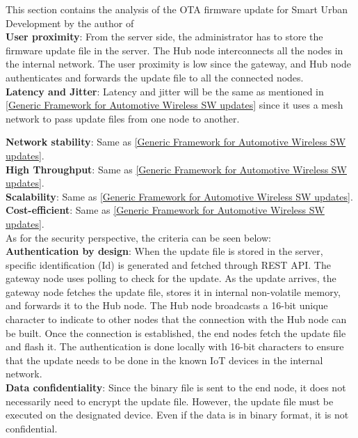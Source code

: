 \documentclass[12pt,a4paper]{article}
\begin{document}
{This section contains the analysis of the OTA firmware update for Smart Urban Development by the author of \cite{r30} \\

\textbf{User proximity}: From the server side, the administrator has to store the firmware update file in the server. The Hub node interconnects all the nodes in the internal network. The user proximity is low since the gateway, and Hub node authenticates and forwards the update file to all the connected nodes. \\

\textbf{Latency and Jitter}: Latency and jitter will be the same as mentioned in \ref{Generic Framework for Automotive Wireless SW updates} since it uses a mesh network to pass update files from one node to another.

\textbf{Network stability}: Same as \ref{Generic Framework for Automotive Wireless SW updates}. \\

\textbf{High Throughput}: Same as \ref{Generic Framework for Automotive Wireless SW updates}. \\

\textbf{Scalability}: Same as \ref{Generic Framework for Automotive Wireless SW updates}. \\

\textbf{Cost-efficient}: Same as \ref{Generic Framework for Automotive Wireless SW updates}. \\

As for the security perspective, the criteria can be seen below: \\

\textbf{Authentication by design}: When the update file is stored in the server, specific identification (Id) is generated and fetched through REST API. The gateway node uses polling to check for the update. As the update arrives, the gateway node fetches the update file, stores it in internal non-volatile memory, and forwards it to the Hub node. The Hub node broadcasts a 16-bit unique character to indicate to other nodes that the connection with the Hub node can be built. Once the connection is established, the end nodes fetch the update file and flash it. The authentication is done locally with 16-bit characters to ensure that the update needs to be done in the known IoT devices in the internal network. \\

\textbf{Data confidentiality}: Since the binary file is sent to the end node, it does not necessarily need to encrypt the update file. However, the update file must be executed on the designated device. Even if the data is in binary format, it is not confidential. \\

}
\end{document}
